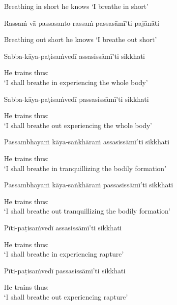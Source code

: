 \begin{cprenglish}
  Breathing in short he knows ‘I breathe in short’
\end{cprenglish}

Rassaṁ vā passasanto rassaṁ passasāmī’ti pajānāti

\begin{cprenglish}
  Breathing out short he knows ‘I breathe out short’
\end{cprenglish}

Sabba-kāya-paṭisaṁvedī assasissāmī’ti sikkhati

\begin{cprenglish}
  He trains thus:\\
  ‘I shall breathe in experiencing the whole body’
\end{cprenglish}

Sabba-kāya-paṭisaṁvedī passasissāmī’ti sikkhati

\begin{cprenglish}
  He trains thus:\\
  ‘I shall breathe out experiencing the whole body’
\end{cprenglish}

Passambhayaṁ kāya-saṅkhāraṁ assasissāmī’ti sikkhati

\begin{cprenglish}
  He trains thus:\\
  ‘I shall breathe in tranquillizing the bodily formation’
\end{cprenglish}

Passambhayaṁ kāya-saṅkhāraṁ passasissāmī’ti sikkhati

\begin{cprenglish}
  He trains thus:\\
  ‘I shall breathe out tranquillizing the bodily formation’
\end{cprenglish}

Pīti-paṭisaṁvedī assasissāmī’ti sikkhati

\begin{cprenglish}
  He trains thus:\\
  ‘I shall breathe in experiencing rapture’
\end{cprenglish}

Pīti-paṭisaṁvedī passasissāmī’ti sikkhati

\begin{cprenglish}
  He trains thus:\\
  ‘I shall breathe out experiencing rapture’
\end{cprenglish}

